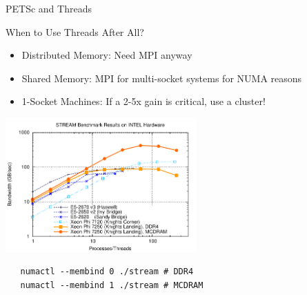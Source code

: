 \begin{frame}[fragile]{PETSc and Threads}
  \begin{block}{When to Use Threads After All?}
    \begin{itemize}
     \item Distributed Memory: Need MPI anyway
     \item Shared Memory: MPI for multi-socket systems for NUMA reasons
     \item 1-Socket Machines: If a 2-5x gain is critical, use a cluster!
    \end{itemize}
  \end{block}

  \begin{center}
    \includegraphics[width=0.55\textwidth]{figures/stream}
  \end{center}
  
  \begin{lstlisting}
   numactl --membind 0 ./stream # DDR4
   numactl --membind 1 ./stream # MCDRAM
  \end{lstlisting}

\end{frame}




